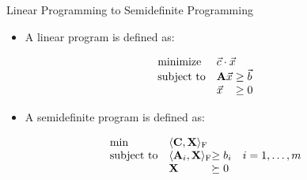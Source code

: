 \documentclass[
	11pt, %
]{beamer}
\begin{document}
\begin{frame}[label={sec:org62a97b6}]{Linear Programming to Semidefinite Programming}
\begin{itemize}
\item A linear program is defined as:
\end{itemize}
\begin{align*}
  \begin{array}{ll@{}ll}
    \text{minimize}   & \vec{c} \cdot \vec{x}& \\
    \text{subject to} & \mathbf{A} \vec{x} &\geq  \vec{b} \\
                      & \vec{x} &\geq 0 \\
    \end{array}
\end{align*}
\begin{itemize}
\item A semidefinite program is defined as:
\end{itemize}
\begin{align*}
  \begin{array}{ll@{}ll}
  \min              & \langle \mathbf{C}, \mathbf{X} \rangle_{\mathrm{F}}                   & \\
  \text{subject to} & \langle \mathbf{A}_i, \mathbf{X} \rangle_{\mathrm{F}} &\geq b_i       & i=1 ,\dots, m\\
                    & \mathbf{X}                      &\succeq 0
  \end{array}
\end{align*}
\end{frame}
\end{document}
